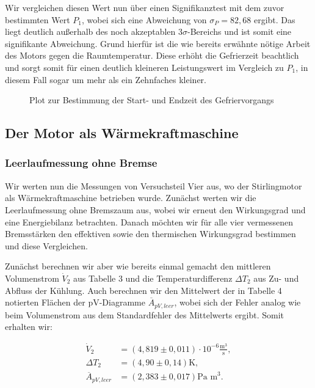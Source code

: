 \documentclass{article}
\begin{document}
Wir vergleichen diesen Wert nun über einen Signifikanztest mit dem zuvor bestimmten Wert $P_1$, wobei sich eine Abweichung von $\sigma_P = 82,68$ ergibt. Das liegt deutlich außerhalb des noch akzeptablen $3\sigma$-Bereichs und ist somit eine signifikante Abweichung. Grund hierfür ist die wie bereits erwähnte nötige Arbeit des Motors gegen die Raumtemperatur. Diese erhöht die Gefrierzeit beachtlich und sorgt somit für einen deutlich kleineren Leistungswert im Vergleich zu $P_1$, in diesem Fall sogar um mehr als ein Zehnfaches kleiner.

\begin{figure}[!hp]
    \centering
    \caption{Plot zur Bestimmung der Start- und Endzeit des Gefriervorgangs}
    \label{fig:GefrierPLT}
\end{figure}

\clearpage
\newpage
\subsection{Der Motor als Wärmekraftmaschine}

\subsubsection{Leerlaufmessung ohne Bremse}

Wir werten nun die Messungen von Versuchsteil Vier aus, wo der Stirlingmotor als Wärmekraftmaschine betrieben wurde. Zunächst werten wir die Leerlaufmessung ohne Bremszaum aus, wobei wir erneut den Wirkungsgrad und eine Energiebilanz betrachten. Danach möchten wir für alle vier vermessenen Bremsstärken den effektiven sowie den thermischen Wirkungsgrad bestimmen und diese Vergleichen. 

Zunächst berechnen wir aber wie bereits einmal gemacht den mittleren Volumenstrom $\dot{V}_2$ aus Tabelle 3 und die Temperaturdifferenz $\Delta T_2$ aus Zu- und Abfluss der Kühlung. Auch berechnen wir den Mittelwert der in Tabelle 4 notierten Flächen der pV-Diagramme $\overline{A}_{pV,leer}$, wobei sich der Fehler analog wie beim Volumenstrom aus dem Standardfehler des Mittelwerts ergibt. Somit erhalten wir:

\begin{equation}
    \begin{split}
        \dot{V}_2 &= (4,819 \pm 0,011) \cdot 10^{-6} \frac{\text{m}^3}{\text{s}}, \\
        \Delta T_2 &= (4,90 \pm 0,14) \text{K}, \\
        \overline{A}_{pV,leer} &= (2,383 \pm 0,017) \text{Pa m}^3.
    \end{split}
\end{equation}
\end{document}
